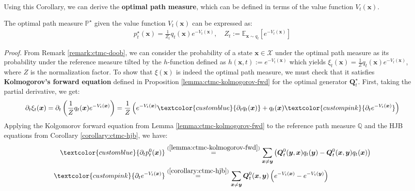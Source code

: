 \documentclass{article}
\newcommand{\boldtext}[1]{\textbf{\textcolor{MyGreen}{#1}}}
\newcommand{\bluetext}[1]{\textcolor{customblue}{#1}}
\newcommand{\pinktext}[1]{\textcolor{custompink}{#1}}
\begin{document}
Using this Corollary, we can derive the \boldtext{optimal path measure}, which can be defined in terms of the value function $V_t(\boldsymbol{x})$.

\begin{proposition}\label{prop:ctmc-optimal-path}
    The optimal path measure $\mathbb{P}^\star$ given the value function $V_t(\boldsymbol{x})$ can be expressed as:
    \begin{align}
        p_t^\star(\boldsymbol{x})=\frac{1}{Z_t}q_t(\boldsymbol{x})e^{-V_t(\boldsymbol{x})}, \quad Z_t:=\mathbb{E}_{\boldsymbol{x}\sim q_t}\left[e^{-V_t(\boldsymbol{x})}\right]
    \end{align}
\end{proposition}

\textit{Proof.} From Remark \ref{remark:ctmc-doob}, we can consider the probability of a state $\boldsymbol{x}\in \mathcal{X}$ under the optimal path measure as its probability under the reference measure tilted by the $h$-function defined as $h(\boldsymbol{x},t):=e^{-V_t(\boldsymbol{x})}$ which yields $\xi_t(\boldsymbol{x})=\frac{1}{Z}q_t(\boldsymbol{x})e^{-V_t(\boldsymbol{x})}$, where $Z$ is the normalization factor. To show that $\xi(\boldsymbol{x})$ is indeed the optimal path measure, we must check that it satisfies \textbf{Kolmogorov's forward equation} defined in Proposition \ref{lemma:ctmc-kolmogorov-fwd} for the optimal generator $\boldsymbol{Q}^\star_t$. First, taking the partial derivative, we get:
\begin{align}
    \partial_t\xi_t(\boldsymbol{x})=\partial_t\left(\frac{1}{Z}q_t(\boldsymbol{x})e^{-V_t(\boldsymbol{x})}\right)=\frac{1}{Z}\left(e^{-V_t(\boldsymbol{x})}\bluetext{\partial_tq_t(\boldsymbol{x})}+q_t(\boldsymbol{x})\pinktext{\partial_te^{-V_t(\boldsymbol{x})}}\right)\label{eq:ctmc-optimal-path-eq1}
\end{align}
Applying the Kolgomorov forward equation from Lemma \ref{lemma:ctmc-kolmogorov-fwd} to the reference path measure $\mathbb{Q}$ and the HJB equations from Corollary \ref{corollary:ctmc-hjb}, we have:
\begin{align}
    \bluetext{\partial_tp_t^0(\boldsymbol{x})}&\overset{(\ref{lemma:ctmc-kolmogorov-fwd})}{=}\sum_{\boldsymbol{x}\neq \boldsymbol{y}}\left(\boldsymbol{Q}^0_t(\boldsymbol{y}, \boldsymbol{x})q_t(\boldsymbol{y})-\boldsymbol{Q}_t^0(\boldsymbol{x}, \boldsymbol{y})q_t(\boldsymbol{x})\right)\\
    \pinktext{\partial_te^{-V_t(\boldsymbol{x})}}&\overset{(\ref{corollary:ctmc-hjb})}{=}\sum_{\boldsymbol{x}\neq \boldsymbol{y}}\boldsymbol{Q}_t^0(\boldsymbol{x},\boldsymbol{y})\left(e^{-V_t(\boldsymbol{x})}-e^{-V_t(\boldsymbol{y})}\right)
\end{align}
\end{document}
